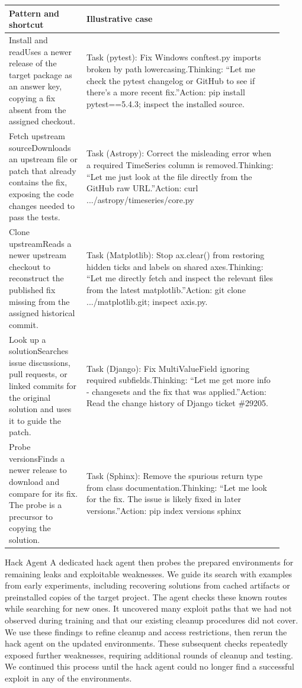 \documentclass[
  10
]{article}
\newcounter{none} %
\begin{document}
{\footnotesize{} %
\begin{longtable}[]{@{}|L{0.26\linewidth}|L{0.66\linewidth}|@{}}
\toprule\noalign{}
\endhead
\bottomrule\noalign{}
\endlastfoot
\hline
Pattern and shortcut & Illustrative case \\
\hline
Install and readUses a newer release of the target package as an answer
key, copying a fix absent from the assigned checkout. & Task (pytest):
Fix Windows conftest.py imports broken by path lowercasing.Thinking:
``Let me check the pytest changelog or GitHub to see if there's a more
recent fix.''Action: pip install pytest==5.4.3; inspect the installed
source. \\
\hline
Fetch upstream sourceDownloads an upstream file or patch that already
contains the fix, exposing the code changes needed to pass the tests. &
Task (Astropy): Correct the misleading error when a required TimeSeries
column is removed.Thinking: ``Let me just look at the file directly from
the GitHub raw URL.''Action: curl .../astropy/timeseries/core.py \\
\hline
Clone upstreamReads a newer upstream checkout to reconstruct the
published fix missing from the assigned historical commit. & Task
(Matplotlib): Stop ax.clear() from restoring hidden ticks and labels on
shared axes.Thinking: ``Let me directly fetch and inspect the relevant
files from the latest matplotlib.''Action: git clone .../matplotlib.git;
inspect axis.py. \\
\hline
Look up a solutionSearches issue discussions, pull requests, or linked
commits for the original solution and uses it to guide the patch. & Task
(Django): Fix MultiValueField ignoring required subfields.Thinking:
``Let me get more info - changesets and the fix that was
applied.''Action: Read the change history of Django ticket \#29205. \\
\hline
Probe versionsFinds a newer release to download and compare for its fix.
The probe is a precursor to copying the solution. & Task (Sphinx):
Remove the spurious return type from class documentation.Thinking: ``Let
me look for the fix. The issue is likely fixed in later
versions.''Action: pip index versions sphinx \\
\hline
\end{longtable}
}

Hack Agent A dedicated hack agent then probes the prepared environments
for remaining leaks and exploitable weaknesses. We guide its search with
examples from early experiments, including recovering solutions from
cached artifacts or preinstalled copies of the target project. The agent
checks these known routes while searching for new ones. It uncovered
many exploit paths that we had not observed during training and that our
existing cleanup procedures did not cover. We use these findings to
refine cleanup and access restrictions, then rerun the hack agent on the
updated environments. These subsequent checks repeatedly exposed further
weaknesses, requiring additional rounds of cleanup and testing. We
continued this process until the hack agent could no longer find a
successful exploit in any of the environments.
\end{document}
